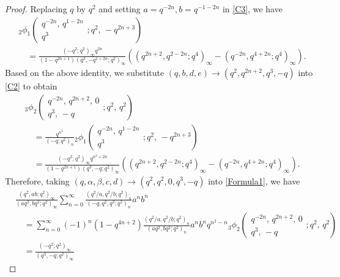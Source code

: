 \documentclass[reqno,12pt]{amsart}
\theoremstyle{remark}
\numberwithin{equation}{section}
\begin{document}
\begin{proof}
Replacing $q$ by $q^2$ and setting $a=q^{-2n}, b=q^{-1-2n}$ in \eqref{C3}, we have
\begin{align*}
&{_2\phi_1}\left(\begin{array}{cc}
q^{-2n},\,q^{1-2n}\\
q^3
\end{array};q^2,\,-q^{2n+3}
\right)\\
&\quad=\frac{\left(-q^2;q^2\right)_{\infty}q^{2n}}{\left(1-q^{2n+1}\right)
\left(q^3,-q^{1+2n};q^2\right)_{\infty}}
\left(\left(q^{2n+2},q^{2-2n};q^4\right)_{\infty}
-\left(q^{-2n},q^{4+2n};q^4\right)_{\infty}\right).
\end{align*}
Based on the above identity, we substitute $\left(q,b,d,e\right)\to\left(q^2,q^{2n+2},q^3,-q\right)$ into \eqref{C2} to obtain
\begin{align*}
&{_3\phi_2}\left(\begin{array}{ccc}
q^{-2n},\,q^{2n+2},\,0\\
q^3,\,-q
\end{array};q^2,\,q^2
\right)\\
&\quad=\frac{q^{n^2}}{\left(-q;q^2\right)_n}
{_2\phi_1}\left(\begin{array}{cc}
q^{-2n},\,q^{1-2n}\\
q^3
\end{array};q^2,\,-q^{2n+3}
\right)\\
&\quad=\frac{\left(-q^2;q^2\right)_{\infty}q^{n^2+2n}}{\left(1-q^{2n+1}\right)
\left(q^3,-q;q^2\right)_{\infty}}
\left(\left(q^{2n+2},q^{2-2n};q^4\right)_{\infty}
-\left(q^{-2n},q^{4+2n};q^4\right)_{\infty}\right).
\end{align*}
Therefore, taking $\left(q,\alpha,\beta,c,d\right)\to\left(q^2,q^2,0,q^3,-q\right)$ into \eqref{Formula1}, we have
\begin{align*}
&\frac{\left(q^2,ab;q^2\right)_{\infty}}{\left(aq^2,bq^2;q^2\right)_{\infty}}
\sum_{n=0}^{\infty}\frac{\left(q^2/a,q^2/b;q^2\right)_n}
{\left(-q,q^2,q^3;q^2\right)_n}a^nb^n\\
&\quad=
\sum_{n=0}^{\infty}\left(-1\right)^n\left(1-q^{4n+2}\right)
\frac{\left(q^2/a,q^2/b;q^2\right)_n}{\left(aq^2,bq^2;q^2\right)_n}a^nb^nq^{n^2-n}
{_3\phi_2}\left(\begin{array}{ccc}
q^{-2n},\,q^{2n+2},\,0\\
q^3,\,-q
\end{array};q^2,\,q^2
\right)\\
&\quad=\frac{\left(-q^2;q^2\right)_{\infty}}{\left(q^3,-q;q^2\right)_{\infty}}

\end{align*}
\end{proof}
\end{document}
